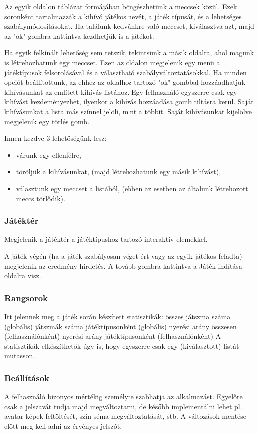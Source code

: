 Az egyik oldalon táblázat formájában böngészhetünk a meccsek közül. Ezek soronként tartalmazzák a kihívó játékos nevét, a játék típusát, és a lehetséges szabálymódosításokat. Ha találunk kedvünkre való meccset, kiválasztva azt, majd az "ok" gombra kattintva kezdhetjük is a játékot.

Ha egyik felkínált lehetőség sem tetszik, tekintsünk a másik oldalra, ahol magunk is létrehozhatunk egy meccset. Ezen az oldalon megjelenik egy menü a játéktípusok felsorolásával és a választható szabályváltoztatásokkal. Ha minden opciót beállítottunk, az ehhez az oldalhoz tartozó "ok" gombbal hozzáadhatjuk kihívásunkat az említett kihívás listához. Egy felhasználó egyszerre csak egy kihívást kezdeményezhet, ilyenkor a kihívás hozzáadása gomb tiltásra kerül. Saját kihívásunkat a lista más színnel jelöli, mint a többit. Saját kihívásunkat kijelölve megjelenik egy törlés gomb. 

Innen kezdve 3 lehetőségünk lesz:
\begin{itemize}
	\item várunk egy ellenfélre,
	\item töröljük a kihívásunkat, (majd létrehozhatunk egy másik kihívást),
	\item választunk egy meccset a listából, (ebben az esetben az általunk létrehozott meccs törlődik).
\end{itemize}

\subsubsection{Játéktér}
Megjelenik a játéktér a játéktípushoz tartozó interaktív elemekkel.

A játék végén (ha a játék szabályosan véget ért vagy az egyik játékos feladta) megjelenik az eredmény-hirdetés. A tovább gombra kattintva a Játék indítása oldalra visz.

\subsubsection{Rangsorok}
Itt jelennek meg a játék során készített statisztikák:
összes játszma száma (globális)
játszmák száma játéktípusonként (globális)
nyerési arány összesen (felhasználónként)
nyerési arány játéktípusonként (felhasználónként)
A statisztikák elkészíthetők úgy is, hogy egyszerre csak egy (kiválasztott) listát mutasson.

\subsubsection{Beállítások}
A felhasználó bizonyos mértékig személyre szabhatja az alkalmazást. Egyelőre csak a jelszavát tudja majd megváltoztatni, de később implementálni lehet pl. avatar képek feltöltését, szín séma megváltoztatását, stb. A változások mentése előtt meg kell adni az érvényes jelszót.

